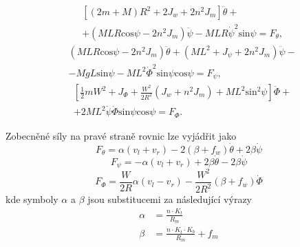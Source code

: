 \documentclass[conference]{IEEEtran}
\begin{document}
\begin{equation}
    \begin{aligned}
        &\left[(2m + M) R^2 + 2 J_w + 2n^2 J_m\right] \ddot{\theta} + \\
        &+ (MLR \text{cos} \psi - 2n^2 J_m) \ddot{\psi} - MLR\dot{\psi}^2 \text{sin} \psi = F_\theta,
    \end{aligned}
    \label{eq:pohyb1}
\end{equation}
\begin{equation}
    \begin{aligned}
        & (MLR \text{cos} \psi - 2n^2 J_m) \ddot{\theta} + (ML^2 + J_\psi + 2n^2 J_m) \ddot{\psi} - \\
        & - MgL\text{sin}\psi - ML^2\dot{\varPhi}^2 \text{sin} \psi \text{cos} \psi = F_\psi,
    \end{aligned}
    \label{eq:pohyb2}
\end{equation}
\begin{equation}
    \begin{aligned}
        &\left[ \frac{1}{2} mW^2  + J_\varPhi + \frac{W^2}{2R^2}\left( J_w + n^2 J_m \right) + ML^2 \text{sin}^2 \psi \right] \ddot{\varPhi} + \\
        &+ 2ML^2 \dot{\psi} \dot{\varPhi} \text{sin}\psi \text{cos} \psi = F_\varPhi.
    \end{aligned}
    \label{eq:pohyb3}
\end{equation}

Zobecněné síly na pravé straně rovnic lze vyjádřit jako
\begin{equation}
    F_\theta = \alpha(v_l + v_r) - 2(\beta + f_w) \dot{\theta} + 2\beta\dot{\psi}
    \label{eq:motor1}
\end{equation}
\begin{equation}
    F_\psi = -\alpha(v_l + v_r) + 2\beta \dot{\theta} - 2\beta \dot{\psi}
    \label{eq:motor2}
\end{equation}
\begin{equation}
    F_\varPhi = \frac{W}{2R} \alpha (v_l - v_r) - \frac{W^2}{2R^2}(\beta + f_w) \dot{\varPhi}
    \label{eq:motor3}
\end{equation}
kde symboly $\alpha$ a $\beta$ jsou substitucemi za následující výrazy
\begin{equation}
    \begin{split}
        \alpha &= \frac{n \cdot K_t} {R_m}  \\
        \beta &= \frac{n \cdot K_t \cdot K_b} {R_m} + f_m 
    \end{split}
    \label{eq:motor_substituce}
\end{equation}
\end{document}
